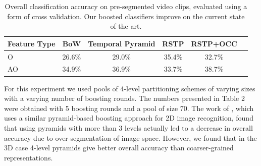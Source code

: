 \documentclass{bmvc2k}
\begin{document}
  \begin{table}
		\begin{center}
			\begin{tabular}{|l|c|c|c|c|c|}
				\hline
        Feature Type & BoW & Temporal Pyramid \cite{Ramanan12} & RSTP & RSTP+OCC \\
				\hline\hline
        O & 26.6\% & 29.0\% & 35.4\% & 32.7\%\\
        \hline
        AO & 34.9\% & 36.9\% & 33.7\% & 38.7\%\\
				\hline
			\end{tabular}
		\end{center}
		\caption{Overall classification accuracy on pre-segmented video clips,
    evaluated using a form of cross validation. Our boosted classifiers
  improve on the current state of the art.}
	\end{table}
  
	For this experiment we used pools of 4-level partitioning schemes of
  varying sizes with a varying number of boosting rounds. The numbers
  presented in Table 2 were obtained with 5 boosting rounds and a pool of
  size 70.
  The work of \cite{Jiang12}, which uses a similar
  pyramid-based boosting approach for 2D image recognition, found that using
  pyramids with more than 3 levels actually led to a decrease in overall
  accuracy due to over-segmentation of image space. However, we found that in the
  3D case 4-level pyramids give better overall accuracy than coarser-grained
  representations.
\end{document}
